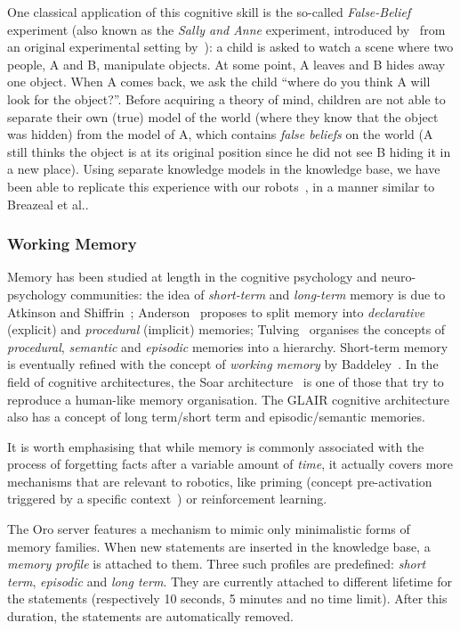 \documentclass[preprint,3p,times]{elsarticle}
\newcommand{\etal}{et al.\xspace}
\begin{document}
One classical application of this cognitive skill is the so-called
\emph{False-Belief} experiment (also known as the \emph{Sally and Anne}
experiment, introduced by~\cite{wimmer1983beliefs} from an original
experimental setting by~\cite{baron1985does}): a child is asked to watch a scene where two
people, A and B, manipulate objects. At some point, A leaves and B hides away one
object. When A comes back, we ask the child ``where do you think A will
look for the object?''. Before acquiring a theory of mind, children are not
able to separate their own (true) model of the world (where they know that
the object was hidden) from the model of A, which contains \emph{false
beliefs} on the world (A still thinks the object is at its original
position since he did not see B hiding it in a new place). Using separate knowledge models
in the knowledge base, we have been able to replicate this experience with
our robots~\cite{warnier2012when}, in a manner similar to Breazeal
\etal\cite{breazeal2009embodied}.

\subsubsection{Working Memory}
\label{memory}

Memory has been studied at length in the cognitive psychology and
neuro-psychology communities: the idea of \emph{short-term} and \emph{long-term}
memory is due to Atkinson and Shiffrin~\cite{Atkinson1968};
Anderson~\cite{Anderson1976} proposes to split memory into \emph{declarative}
(explicit) and \emph{procedural} (implicit) memories; Tulving~\cite{Tulving1985}
organises the concepts of \emph{procedural}, \emph{semantic} and \emph{episodic}
memories into a hierarchy. Short-term memory is eventually refined with the
concept of \emph{working memory} by Baddeley~\cite{Baddeley2010}.  In the field
of cognitive architectures, the {\sc Soar} architecture~\cite{Lehman2006} is one
of those that try to reproduce a human-like memory organisation. The GLAIR
cognitive architecture~\cite{Shapiro2009} also has a concept of long term/short
term and episodic/semantic memories.

It is worth emphasising that while memory is commonly associated with the process of
forgetting facts after a variable amount of \emph{time}, it actually covers
more mechanisms that are relevant to robotics, like priming
(concept pre-activation triggered by a specific
context~\cite{baxter2012modelling}) or reinforcement learning.

The {\sc Oro} server features a mechanism to mimic only minimalistic forms of memory
families.  When new statements are inserted in the knowledge base, a
\emph{memory profile} is attached to them.  Three such profiles are
predefined: {\it short term}, {\it episodic} and {\it long term}. They are
currently attached to different lifetime for the statements (respectively 10
seconds, 5 minutes and no time limit). After this duration, the statements are
automatically removed.
\end{document}
